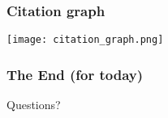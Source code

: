 \documentclass{i20lecture}
\begin{document}
\begin{frame}
	\frametitle{Citation graph} 

	\begin{center}
		\texttt{[image: citation\_graph.png]}
	\end{center}
\end{frame}

\begin{frame}
	\frametitle{The End (for today)}
	\begin{center}
		\Large Questions?
	\end{center}
\end{frame}
\end{document}
